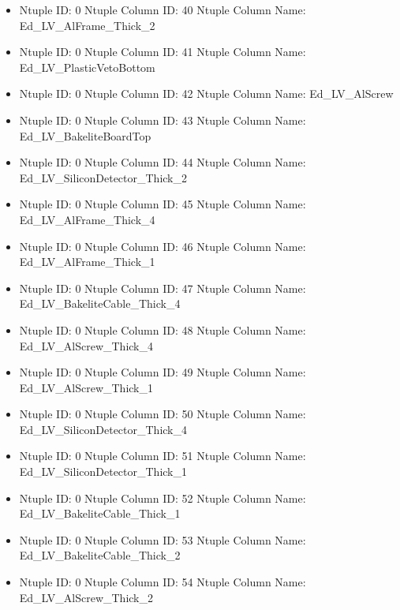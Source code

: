 \documentclass[8pt]{beamer}
\begin{document}
\begin{frame}
\begin{itemize}
        \item Ntuple ID: 0 Ntuple Column ID: 40 Ntuple Column Name: Ed\_LV\_AlFrame\_Thick\_2
        
        \item Ntuple ID: 0 Ntuple Column ID: 41 Ntuple Column Name: Ed\_LV\_PlasticVetoBottom
        
        \item Ntuple ID: 0 Ntuple Column ID: 42 Ntuple Column Name: Ed\_LV\_AlScrew
        
        \item Ntuple ID: 0 Ntuple Column ID: 43 Ntuple Column Name: Ed\_LV\_BakeliteBoardTop
        
        \item Ntuple ID: 0 Ntuple Column ID: 44 Ntuple Column Name: Ed\_LV\_SiliconDetector\_Thick\_2
        
        \item Ntuple ID: 0 Ntuple Column ID: 45 Ntuple Column Name: Ed\_LV\_AlFrame\_Thick\_4
        
        \item Ntuple ID: 0 Ntuple Column ID: 46 Ntuple Column Name: Ed\_LV\_AlFrame\_Thick\_1
        
        \item Ntuple ID: 0 Ntuple Column ID: 47 Ntuple Column Name: Ed\_LV\_BakeliteCable\_Thick\_4
        
        \item Ntuple ID: 0 Ntuple Column ID: 48 Ntuple Column Name: Ed\_LV\_AlScrew\_Thick\_4
        
        \item Ntuple ID: 0 Ntuple Column ID: 49 Ntuple Column Name: Ed\_LV\_AlScrew\_Thick\_1
        
        \item Ntuple ID: 0 Ntuple Column ID: 50 Ntuple Column Name: Ed\_LV\_SiliconDetector\_Thick\_4
        
        \item Ntuple ID: 0 Ntuple Column ID: 51 Ntuple Column Name: Ed\_LV\_SiliconDetector\_Thick\_1
        
        \item Ntuple ID: 0 Ntuple Column ID: 52 Ntuple Column Name: Ed\_LV\_BakeliteCable\_Thick\_1
        
        \item Ntuple ID: 0 Ntuple Column ID: 53 Ntuple Column Name: Ed\_LV\_BakeliteCable\_Thick\_2
        
        \item Ntuple ID: 0 Ntuple Column ID: 54 Ntuple Column Name: Ed\_LV\_AlScrew\_Thick\_2
        

\end{itemize}
\end{frame}
\end{document}
